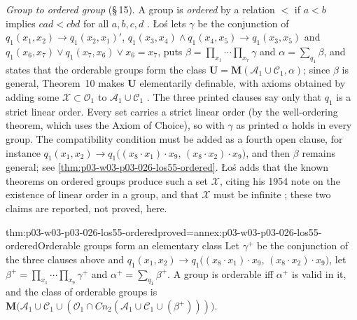 \emph{Group to ordered group} (\S\,15).  A group is \emph{ordered} by a
relation \(<\) if \(a<b\) implies \(cad<cbd\) for all
\(a,b,c,d\) \cite[p.~52]{Los1955}.  \L o\'s lets \(\gamma\) be the
conjunction of
\(q_1(x_1,x_2)\to q_1(x_2,x_1)'\),
\(q_1(x_3,x_4)\land q_1(x_4,x_5)\to q_1(x_3,x_5)\) and
\(q_1(x_6,x_7)\lor q_1(x_7,x_6)\lor x_6=x_7\), puts
\(\beta=\prod_{x_1}\cdots\prod_{x_7}\gamma\) and
\(\alpha=\sum_{q_1}\beta\), and states that the orderable groups form the
class \(\mathbf U=\mathbf M(\mathcal A_1\cup\mathcal C_1,\alpha)\); since
\(\beta\) is general, Theorem~10 makes \(\mathbf U\) elementarily definable,
with axioms obtained by adding some \(\mathcal X\subset\mathcal O_1\) to
\(\mathcal A_1\cup\mathcal C_1\) \cite[p.~52]{Los1955}.  The three printed
clauses say only that \(q_1\) is a strict linear order.  Every set carries a
strict linear order (by the well-ordering theorem, which uses the Axiom of
Choice), so with \(\gamma\) as
printed \(\alpha\) holds in every group.  The compatibility condition must be
added as a fourth open clause, for instance
\(q_1(x_1,x_2)\to q_1\bigl((x_8\cdot x_1)\cdot x_9,\,(x_8\cdot x_2)\cdot x_9\bigr)\), and
then \(\beta\) remains general; see
\cref{thm:p03-w03-p03-026-los55-ordered}.  \L o\'s adds that the known
theorems on ordered groups produce such a set \(\mathcal X\), citing his 1954
note on the existence of linear order in a group, and that \(\mathcal X\)
must be infinite \cite[p.~52]{Los1955}; these two claims are reported, not
proved, here.

\begin{hbcorollary}{thm:p03-w03-p03-026-los55-ordered}{proved=annex:p03-w03-p03-026-los55-ordered}{Orderable groups form an elementary class}
Let \(\gamma^+\) be the conjunction of the three clauses above and
\(q_1(x_1,x_2)\to q_1\bigl((x_8\cdot x_1)\cdot x_9,\,(x_8\cdot x_2)\cdot x_9\bigr)\), let
\(\beta^+=\prod_{x_1}\cdots\prod_{x_9}\gamma^+\) and
\(\alpha^+=\sum_{q_1}\beta^+\).  A group is orderable iff \(\alpha^+\) is valid
in it, and the class of orderable groups is
\(\mathbf M\bigl(\mathcal A_1\cup\mathcal C_1\cup(\mathcal O_1\cap\mathit{Cn}_2(\mathcal A_1\cup\mathcal C_1\cup(\beta^+)))\bigr)\).
\end{hbcorollary}

